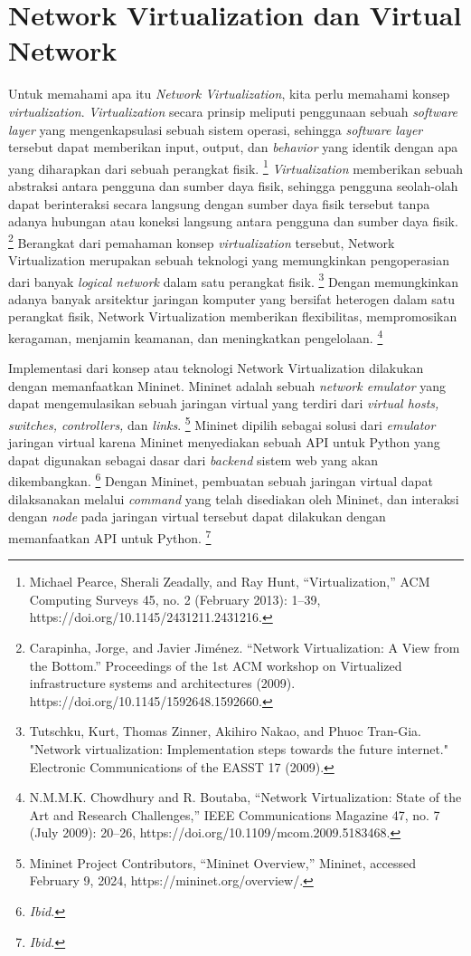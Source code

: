 \section{Network Virtualization dan Virtual Network}
\label{sec:latex}
Untuk memahami apa itu \textit{Network Virtualization}, kita perlu memahami konsep \textit{virtualization}.
\textit{Virtualization} secara prinsip meliputi penggunaan sebuah \textit{software layer} yang mengenkapsulasi sebuah sistem operasi, sehingga
\textit{software layer} tersebut dapat memberikan input, output, dan \textit{behavior} yang identik dengan apa yang diharapkan dari sebuah perangkat fisik.
\footnote{Michael Pearce, Sherali Zeadally, and Ray Hunt, “Virtualization,” ACM Computing Surveys 45, no. 2 (February 2013): 1–39, https://doi.org/10.1145/2431211.2431216.}
\textit{Virtualization} memberikan sebuah abstraksi antara pengguna dan sumber daya fisik, sehingga pengguna seolah-olah dapat berinteraksi secara langsung dengan
sumber daya fisik tersebut tanpa adanya hubungan atau koneksi langsung antara pengguna dan sumber daya fisik.
\footnote{Carapinha, Jorge, and Javier Jiménez. “Network Virtualization: A View from the Bottom.” Proceedings of the 1st ACM workshop on Virtualized infrastructure systems and architectures (2009). https://doi.org/10.1145/1592648.1592660. }
Berangkat dari pemahaman konsep \textit{virtualization} tersebut, Network Virtualization merupakan sebuah teknologi yang memungkinkan pengoperasian dari 
banyak \textit{logical network} dalam satu perangkat fisik.
\footnote{Tutschku, Kurt, Thomas Zinner, Akihiro Nakao, and Phuoc Tran-Gia. "Network virtualization: Implementation steps towards the future internet." Electronic Communications of the EASST 17 (2009).}
Dengan memungkinkan adanya banyak arsitektur jaringan komputer yang bersifat heterogen dalam satu perangkat fisik, Network Virtualization memberikan flexibilitas, mempromosikan keragaman, menjamin keamanan, 
dan meningkatkan pengelolaan.
\footnote{N.M.M.K. Chowdhury and R. Boutaba, “Network Virtualization: State of the Art and Research Challenges,” IEEE Communications Magazine 47, no. 7 (July 2009): 20–26, https://doi.org/10.1109/mcom.2009.5183468.}
\par

Implementasi dari konsep atau teknologi Network Virtualization dilakukan dengan memanfaatkan Mininet. Mininet adalah sebuah \textit{network emulator} yang 
dapat mengemulasikan sebuah jaringan virtual yang terdiri dari \textit{virtual hosts, switches, controllers,} dan \textit{links}. 
\footnote{Mininet Project Contributors, “Mininet Overview,” Mininet, accessed February 9, 2024, https://mininet.org/overview/.}
Mininet dipilih sebagai solusi dari \textit{emulator} jaringan virtual karena Mininet menyediakan sebuah API untuk Python yang dapat digunakan
sebagai dasar dari \textit{backend} sistem web yang akan dikembangkan. 
\footnote{\textit{Ibid.}}
Dengan Mininet, pembuatan sebuah jaringan virtual dapat dilaksanakan melalui \textit{command} yang telah disediakan oleh Mininet, dan interaksi dengan \textit{node} 
pada jaringan virtual tersebut dapat dilakukan dengan memanfaatkan API untuk Python.
\footnote{\textit{Ibid.}}
\par

